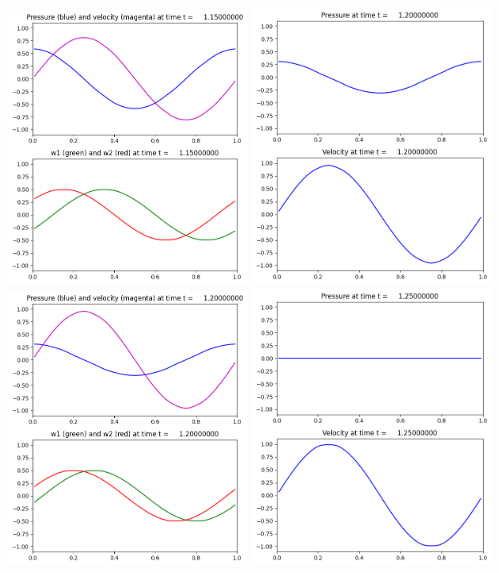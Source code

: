 \documentclass[11pt]{article}
\begin{document}
\includegraphics[width=0.475\textwidth]{frame0023fig2.png}
\vskip 10pt 
\includegraphics[width=0.475\textwidth]{frame0024fig1.png}
\includegraphics[width=0.475\textwidth]{frame0024fig2.png}
\vskip 10pt 
\includegraphics[width=0.475\textwidth]{frame0025fig1.png}
\end{document}
